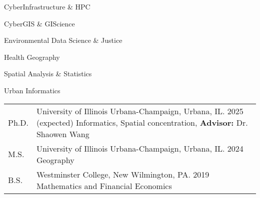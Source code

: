 \documentclass{acmcv}
\begin{document}
	\begin{multicols}{2}
		\begin{titemize}
			\item CyberInfrastructure \& HPC
			\item CyberGIS \& GIScience
			\item Environmental Data Science \& Justice
			\item Health Geography
			\item Spatial Analysis \& Statistics
            \item Urban Informatics
		\end{titemize}
	\end{multicols}


    \begin{longtable}{p{0.1\linewidth} p{0.9\linewidth}}
        Ph.D. & University of Illinois Urbana-Champaign, Urbana, IL. 2025 (expected) \newline Informatics, Spatial concentration, \textbf{Advisor:} Dr. Shaowen Wang \\

        M.S. & University of Illinois Urbana-Champaign, Urbana, IL. 2024 \newline Geography\\

        B.S. & Westminster College, New Wilmington, PA. 2019 \newline Mathematics and Financial Economics\\
    \end{longtable}
    \vspace*{-0.25cm}

		\vspace{-.6cm}
        \nocite{*}
        \newrefcontext[labelprefix=R]
        \printbibliography[title={\normalsize Journal Articles Under Review}, type=article, keyword=inreview]
		\vspace{-.8cm}
        \newrefcontext[labelprefix=J]
		\printbibliography[title={\normalsize {Journal Articles}},type=article, keyword=journalarticle]
		\vspace{-.8cm}
        \newrefcontext[labelprefix=C]
		\printbibliography[title={\normalsize {Peer-Reviewed Conference Papers}},type=inproceedings, keyword=confpaper]
		\vspace{-.8cm}
        \newrefcontext[labelprefix=A]
        \printbibliography[title={\normalsize {Conference Abstracts}}, keyword=extabs]
	
\end{document}
